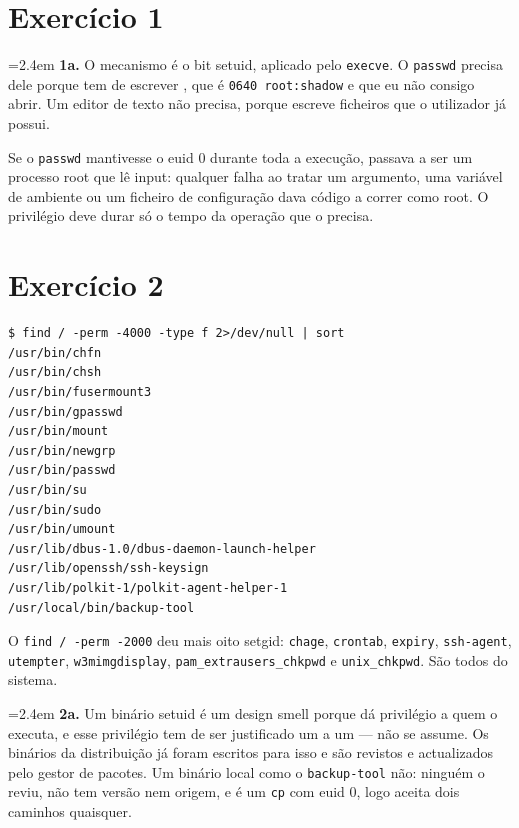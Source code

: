 \documentclass[a4paper,11pt]{article}
\newenvironment{answer}[1]{%
  \par\addvspace{7pt}\noindent
  \hangindent=2.4em\hangafter=1
  {\color{sscnblue}\bfseries #1\hspace{0.55em}}\ignorespaces}
  {\par\addvspace{5pt}}
\newcommand{\cmd}[1]{\textcolor{sscnblue}{\texttt{#1}}}
\newcommand{\file}[1]{\texttt{\detokenize{#1}}}
\begin{document}
\section{Exerc\'icio 1}

\begin{answer}{1a.}
O mecanismo \'e o bit setuid, aplicado pelo \cmd{execve}. O \cmd{passwd} precisa dele
porque tem de escrever \file{/etc/shadow}, que \'e \cmd{0640 root:shadow} e que eu n\~ao
consigo abrir. Um editor de texto n\~ao precisa, porque escreve ficheiros que o
utilizador j\'a possui.

Se o \cmd{passwd} mantivesse o euid 0 durante toda a execu\c{c}\~ao, passava a ser um
processo root que l\^e input: qualquer falha ao tratar um argumento, uma vari\'avel de
ambiente ou um ficheiro de configura\c{c}\~ao dava c\'odigo a correr como root. O
privil\'egio deve durar s\'o o tempo da opera\c{c}\~ao que o precisa.
\end{answer}

\section{Exerc\'icio 2}

\begin{lstlisting}[basicstyle=\ttfamily\footnotesize]
$ find / -perm -4000 -type f 2>/dev/null | sort
/usr/bin/chfn
/usr/bin/chsh
/usr/bin/fusermount3
/usr/bin/gpasswd
/usr/bin/mount
/usr/bin/newgrp
/usr/bin/passwd
/usr/bin/su
/usr/bin/sudo
/usr/bin/umount
/usr/lib/dbus-1.0/dbus-daemon-launch-helper
/usr/lib/openssh/ssh-keysign
/usr/lib/polkit-1/polkit-agent-helper-1
/usr/local/bin/backup-tool
\end{lstlisting}

O \cmd{find / -perm -2000} deu mais oito setgid: \cmd{chage}, \cmd{crontab},
\cmd{expiry}, \cmd{ssh-agent}, \cmd{utempter}, \cmd{w3mimgdisplay},
\cmd{pam\_extrausers\_chkpwd} e \cmd{unix\_chkpwd}. S\~ao todos do sistema.

\begin{answer}{2a.}
Um bin\'ario setuid \'e um design smell porque d\'a privil\'egio a quem o executa, e esse
privil\'egio tem de ser justificado um a um --- n\~ao se assume. Os bin\'arios da
distribui\c{c}\~ao j\'a foram escritos para isso e s\~ao revistos e actualizados pelo
gestor de pacotes. Um bin\'ario local como o \cmd{backup-tool} n\~ao: ningu\'em o reviu,
n\~ao tem vers\~ao nem origem, e \'e um \cmd{cp} com euid 0, logo aceita dois caminhos
quaisquer.
\end{answer}
\end{document}
